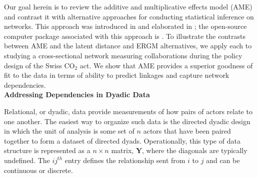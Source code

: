 \documentclass[12pt,twocolumn,twoside]{pnas-new}
\begin{document}

Our goal herein is to review the additive and multiplicative effects model (AME) and contrast it with alternative approaches for conducting statistical inference on networks.
This approach was introduced in \cite{hoff:2008,hoff:2009,hoff:etal:2013} and elaborated in \cite{hoff:2015}; the open-source computer package associated with this approach is \cite{hoff:etal:2015}.
To illustrate the contrasts between AME and the latent distance and ERGM alternatives, we apply each to studying a cross-sectional network measuring collaborations during the policy design of the Swiss CO$_{2}$ act. We show that AME provides a superior goodness of fit to the data in terms of ability to predict linkages and capture network dependencies. 
\\


{\large\sffamily\bfseries{Addressing Dependencies in Dyadic Data}} 
\vspace{0.5em}

Relational, or dyadic, data provide measurements of how pairs of actors relate to one another. The easiest way to organize such data is the directed dyadic design in which the unit of analysis is some set of $n$ actors that have been paired together to form a dataset of directed dyads. 
Operationally, this type of data structure is represented as a $n \times n$ matrix, $\mathbf{Y}$, where the diagonals are typically undefined. The $ij^{th}$ entry defines the relationship sent from $i$ to $j$ and can be continuous or discrete.
\end{document}
